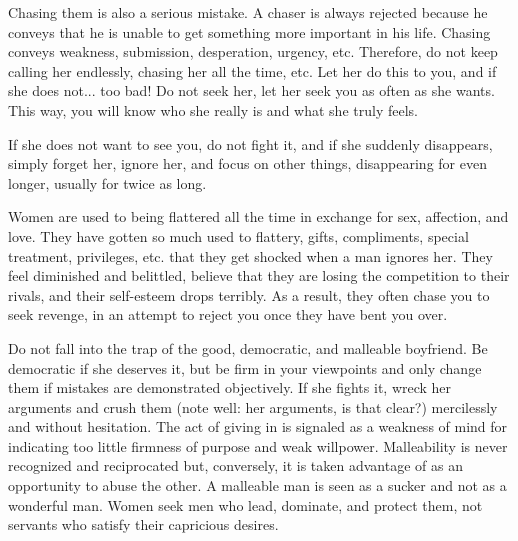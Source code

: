 \par Chasing them is also a serious mistake. A chaser is always rejected because he conveys that he is unable to get something more important in his life. Chasing conveys weakness, submission, desperation, urgency, etc. Therefore, do not keep calling her endlessly, chasing her all the time, etc. Let her do this to you, and if she does not... too bad! Do not seek her, let her seek you as often as she wants. This way, you will know who she really is and what she truly feels.

\par If she does not want to see you, do not fight it, and if she suddenly disappears, simply forget her, ignore her, and focus on other things, disappearing for even longer, usually for twice as long.

\par Women are used to being flattered all the time in exchange for sex, affection, and love. They have gotten so much used to flattery, gifts, compliments, special treatment, privileges, etc. that they get shocked when a man ignores her. They feel diminished and belittled, believe that they are losing the competition to their rivals, and their self-esteem drops terribly. As a result, they often chase you to seek revenge, in an attempt to reject you once they have bent you over.

\par Do not fall into the trap of the good, democratic, and malleable boyfriend. Be democratic if she deserves it, but be firm in your viewpoints and only change them if mistakes are demonstrated objectively. If she fights it, wreck her arguments and crush them (note well: her arguments, is that clear?) mercilessly and without hesitation. The act of giving in is signaled as a weakness of mind for indicating too little firmness of purpose and weak willpower. Malleability is never recognized and reciprocated but, conversely, it is taken advantage of as an opportunity to abuse the other. A malleable man is seen as a sucker and not as a wonderful man. Women seek men who lead, dominate, and protect them, not servants who satisfy their capricious desires.

